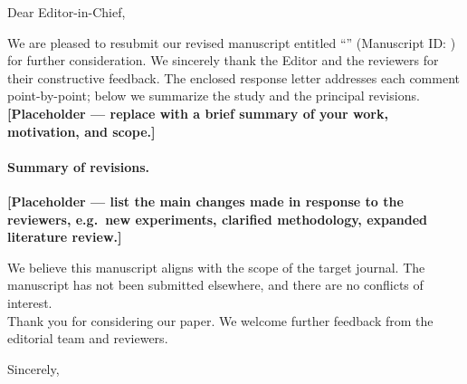 Dear Editor-in-Chief,

We are pleased to resubmit our revised manuscript entitled ``\RRManuscriptTitle'' (Manuscript ID: \RRManuscriptMeta) for further consideration. We sincerely thank the Editor and the reviewers for their constructive feedback. The enclosed response letter addresses each comment point-by-point; below we summarize the study and the principal revisions.\\

\textbf{[Placeholder --- replace with a brief summary of your work, motivation, and scope.]}

\paragraph{Summary of revisions.}
\textbf{[Placeholder --- list the main changes made in response to the reviewers, e.g.\ new experiments, clarified methodology, expanded literature review.]}

We believe this manuscript aligns with the scope of the target journal. The manuscript has not been submitted elsewhere, and there are no conflicts of interest. \\

Thank you for considering our paper. We welcome further feedback from the editorial team and reviewers.

\bigskip

Sincerely,\\
\RRAuthorBlock
